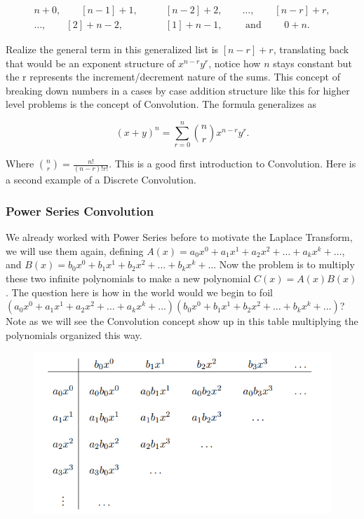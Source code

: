 \documentclass[12pt]{article}
\begin{document}
\begin{align*}
    n+0, \qquad [n-1]+1, \qquad &[n-2]+2, \qquad \ldots, \qquad [n-r]+r, \\
    \ldots, \qquad [2]+n-2, \qquad &[1]+n-1, \qquad\text{ and } \qquad 0+n.
\end{align*}

Realize the general term in this generalized list is $[n-r]+r$, translating back that would be an exponent structure of $x^{n-r}y^r$, notice how $n$ stays constant but the r represents the increment/decrement nature of the sums. This concept of breaking down numbers in a cases by case addition structure like this for higher level problems is the concept of Convolution. The formula generalizes as

\begin{equation*}
    (x+y)^n = \sum_{r=0}^{n} \binom{n}{r} x^{n-r}y^r.
\end{equation*}

Where $\binom{n}{r}=\frac{n!}{(n-r)!r!}$. This is a good first introduction to Convolution. Here is a second example of a Discrete Convolution. \\

\subsubsection{Power Series Convolution}

We already worked with Power Series before to motivate the Laplace Transform, we will use them again, defining $A(x)=a_0x^0+a_1x^1+a_2x^2+\ldots+a_kx^k+\ldots$, and $B(x)=b_0x^0+b_1x^1+b_2x^2+\ldots+b_kx^k+\ldots$ Now the problem is to multiply these two infinite polynomials to make a new polynomial $C(x)=A(x)B(x)$. The question here is how in the world would we begin to foil $(a_0x^0+a_1x^1+a_2x^2+\ldots+a_kx^k+\ldots)(b_0x^0+b_1x^1+b_2x^2+\ldots+b_kx^k+\ldots)$? Note as we will see the Convolution concept show up in this table multiplying the polynomials organized this way. 

\pagebreak

\begin{figure}[!htbp]
\centering
\includegraphics[scale=.5]{Convolution.PNG}
\label{fig:Conv}
\end{figure}
\end{document}
